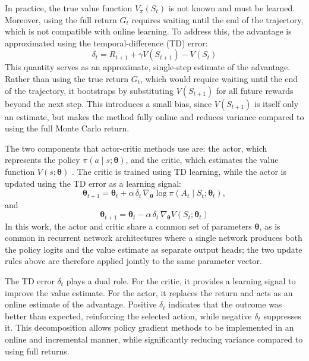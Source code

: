 In practice, the true value function $V_\pi(S_t)$ is not known and must be learned. Moreover, using the full return $G_t$ requires waiting until the end of the trajectory, which is not compatible with online learning. To address this, the advantage is approximated using the temporal-difference (TD) error:
\begin{equation}
\delta_t = R_{t+1} + \gamma V(S_{t+1}) - V(S_t)
\end{equation}
This quantity serves as an approximate, single-step estimate of the advantage. 
Rather than using the true return $G_t$, which would require waiting until the 
end of the trajectory, it bootstraps by substituting $V(S_{t+1})$ for all future 
rewards beyond the next step. This introduces a small bias, since $V(S_{t+1})$ 
is itself only an estimate, but makes the method fully online and reduces 
variance compared to using the full Monte Carlo return.

The two components that actor-critic methods use are: the actor, which represents the policy $\pi(a \mid s; \boldsymbol{\theta})$, and the critic, which estimates the value function $V(s; \boldsymbol{\theta})$ 
\citep{Konda2000ActorCritic}. The critic is trained using TD learning, while the actor is updated using the TD error as a learning signal:
\begin{equation}
\boldsymbol{\theta}_{t+1}
= \boldsymbol{\theta}_t
+ \alpha \, \delta_t \,
\nabla_{\boldsymbol{\theta}} \log \pi(A_t \mid S_t; \boldsymbol{\theta}_t),
\end{equation}
and
\begin{equation}
\boldsymbol{\theta}_{t+1}
= \boldsymbol{\theta}_t
- \alpha \, \delta_t \,
\nabla_{\boldsymbol{\theta}} V(S_t; \boldsymbol{\theta}_t)
\end{equation}
In this work, the actor and critic share a common set of parameters $\boldsymbol{\theta}$, as is common in recurrent network architectures where a single network produces both the policy logits and the value estimate as separate output heads; the two update rules above are therefore applied jointly to the same parameter vector.

The TD error $\delta_t$ plays a dual role. For the critic, it provides a learning signal to improve the value estimate. For the actor, it replaces the return and acts as an online estimate of the advantage. Positive $\delta_t$ indicates that the outcome was better than expected, reinforcing the selected action, while negative $\delta_t$ suppresses it. This decomposition allows policy gradient methods to be implemented in an online and incremental manner, while significantly reducing variance compared to using full returns.

